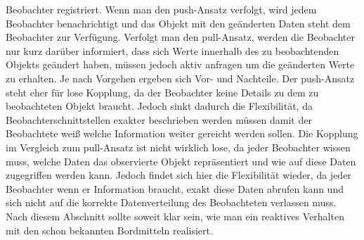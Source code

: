 Beobachter registriert. Wenn man den push-Ansatz verfolgt, wird jedem Beobachter benachrichtigt und das Objekt mit den geänderten Daten steht dem Beobachter zur Verfügung. Verfolgt man den pull-Ansatz, werden die Beobachter nur kurz darüber informiert, dass sich Werte innerhalb des zu beobachtenden Objekts geändert haben, müssen jedoch aktiv anfragen um die geänderten Werte zu erhalten. Je nach Vorgehen ergeben sich Vor- und Nachteile. Der push-Ansatz steht eher für lose Kopplung, da der Beobachter keine Details zu dem zu beobachteten Objekt braucht. Jedoch sinkt dadurch die Flexibilität, da Beobachterschnittstellen exakter beschrieben werden müssen damit der Beobachtete weiß welche Information weiter gereicht werden sollen. Die Kopplung im Vergleich zum pull-Ansatz ist nicht wirklich lose, da jeder Beobachter wissen muss, welche Daten das observierte Objekt repräsentiert und wie auf diese Daten zugegriffen werden kann. Jedoch findet sich hier die Flexibilität wieder, da jeder Beobachter wenn er Information braucht, exakt diese Daten abrufen kann und sich nicht auf die korrekte Datenverteilung des Beobachteten verlassen muss. \\ Nach diesem Abschnitt sollte soweit klar sein, wie man ein reaktives Verhalten mit den schon bekannten Bordmitteln realisiert.
